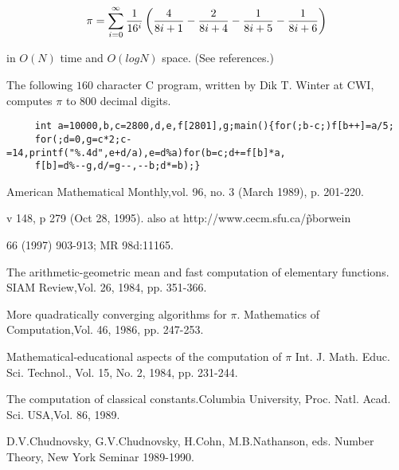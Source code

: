 \[
\pi = \sum_{i=0}^\infty {1 \over 16^i} \left(
  {4 \over 8i+1} - {2 \over 8i+4} - {1 \over 8i+5} - {1 \over 8i+6}
\right)
\]

in $O(N)$ time and $O(log N)$ space. (See references.)

The following $160$ character C program, written by Dik T. Winter at
CWI, computes $\pi$ to 800 decimal digits.

\begin{verbatim}
     int a=10000,b,c=2800,d,e,f[2801],g;main(){for(;b-c;)f[b++]=a/5;
     for(;d=0,g=c*2;c-=14,printf("%.4d",e+d/a),e=d%a)for(b=c;d+=f[b]*a,
     f[b]=d%--g,d/=g--,--b;d*=b);}
\end{verbatim}


\Ref

 {American Mathematical Monthly,}{vol. 96,
  no. 3 (March 1989), p. 201-220.}

 {v 148, p 279 (Oct 28,
  1995).  also at http://www.cecm.sfu.ca/\~pborwein }

  { 66 (1997)
  903-913; MR 98d:11165.}

  {The arithmetic-geometric mean
  and fast computation of elementary functions.}  {SIAM
  Review,}{Vol. 26, 1984, pp. 351-366.}

  {More quadratically converging
  algorithms for $\pi$.}  {Mathematics of Computation,}{Vol. 46, 1986,
  pp. 247-253.}

 {Mathematical-educational
  aspects of the computation of $\pi$}
{Int. J. Math. Educ. Sci. Technol.,} {Vol. 15, No. 2, 1984,
  pp. 231-244.}

  {The computation of
  classical constants.}{Columbia University,
  Proc. Natl. Acad. Sci. USA,}{Vol. 86, 1989.}

 {D.V.Chudnovsky, G.V.Chudnovsky, H.Cohn,
  M.B.Nathanson, eds.}  {Number Theory, New York Seminar 1989-1990.}

